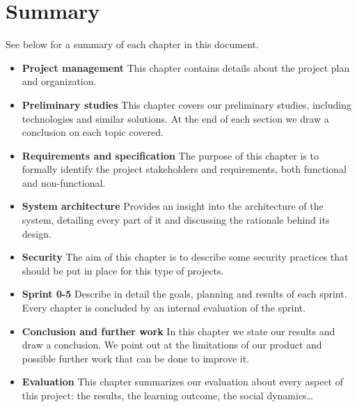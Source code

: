\section{Summary}

See below for a summary of each chapter in this document.

\begin{itemize}
	\item \textbf{Project management}\newline
		This chapter contains details about the project plan and organization.
	\item \textbf{Preliminary studies}\newline
		This chapter covers our preliminary studies, including technologies
		and similar solutions. At the end of each section we draw a conclusion
		on each topic covered.
	\item \textbf{Requirements and specification}\newline
		The purpose of this chapter is to formally identify the project stakeholders
		and requirements, both functional and non-functional.
	\item \textbf{System architecture}\newline
		Provides an insight into the architecture of the system,
		detailing every part of it and discussing the rationale behind its design.
	\item \textbf{Security}\newline
		The aim of this chapter is to describe some security practices that
		should be put in place for this type of projects.
	\item \textbf{Sprint 0-5}\newline
		Describe in detail the goals, planning and results of each sprint.
		Every chapter is concluded by an internal evaluation of the sprint.
	\item \textbf{Conclusion and further work}\newline
		In this chapter we state our results and draw a conclusion.
		We point out at the limitations of our product and possible further work
		that can be done to improve it.
	\item \textbf{Evaluation}\newline
		This chapter summarizes our evaluation about every aspect of this project:
		the results, the learning outcome, the social dynamics\ldots
\end{itemize}